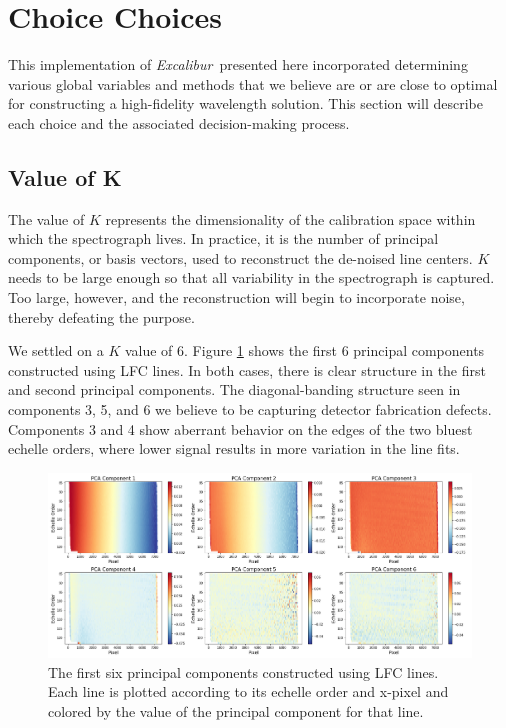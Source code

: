 \documentclass[twocolumn]{aastex63}
\newcommand{\project}[1]{\textsl{#1}}
\newcommand{\name}{\project{Excalibur}}
\begin{document}
\section{Choice Choices} \label{sec:choices}
This implementation of \name\ presented here incorporated determining various global variables and methods that we believe are or are close to optimal for constructing a high-fidelity wavelength solution.  This section will describe each choice and the associated decision-making process.

\subsection{Value of K}
The value of $K$ represents the dimensionality of the calibration space within which the spectrograph lives.  In practice, it is the number of principal components, or basis vectors, used to reconstruct the de-noised line centers.  $K$ needs to be large enough so that all variability in the spectrograph is captured.  Too large, however, and the reconstruction will begin to incorporate noise, thereby defeating the purpose.

We settled on a $K$ value of 6.  Figure \ref{fig:pcLfc} shows the first 6 principal components constructed using LFC lines.  In both cases, there is clear structure in the first and second principal components.  The diagonal-banding structure seen in components 3, 5, and 6 we believe to be capturing detector fabrication defects.  Components 3 and 4 show aberrant behavior on the edges of the two bluest echelle orders, where lower signal results in more variation in the line fits.

\begin{figure}[t]
\centering
\includegraphics[width=\textwidth]{Figures/pcsLfc6.png}
\caption{The first six principal components constructed using LFC lines.  Each line is plotted according to its echelle order and x-pixel and colored by the value of the principal component for that line.}
\label{fig:pcLfc}
\end{figure}
\end{document}
